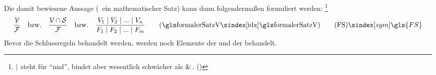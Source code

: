 Die damit bewiesene Aussage (\textzB\ ein mathematischer Satz) kann dann folgendermaßen formuliert werden:%
\footnote{%
	$\mid$ steht für "`und"', bindet aber wesentlich schwächer als $\operatorname{\operatorname{\&}\,}$. ()
}
\[
	\frac{\Voraussetzungen}{\Folgerungen} \quad \text{\textbzw} \quad
	\frac{\Voraussetzungen \cap \Beweisschritte}{\Folgerungen} \quad \text{\textbzw} \quad
	\frac{\Voraussetzung_1 \srand \Voraussetzung_2 \srand ... \srand \Voraussetzung_n}{\Folgerung_1 \srand \Folgerung_2 \srand ... \srand \Folgerung_m}
	\qquad \text{(\glsIdx{formalerSatzV})}
	\tag{\tagFS} \sym{\gls{FS}}
	\label{def:formalerSatz}
\]
Bevor die Schlussregeln behandelt werden, werden noch Elemente der \emph{} und der \emph{} behandelt.


